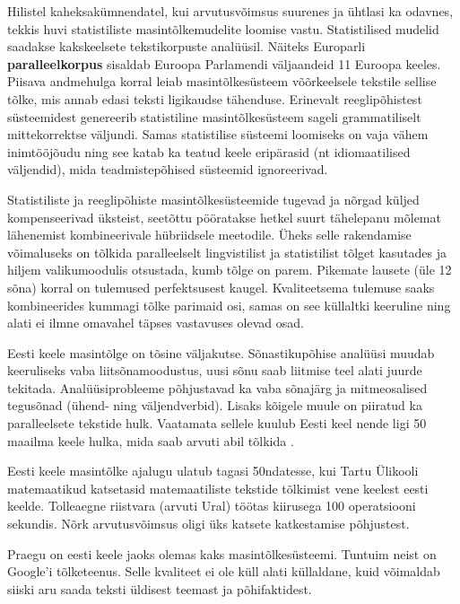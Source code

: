 \begin{multicols}{2}
Hilistel kaheksakümnendatel, kui arvutusvõimsus suurenes ja ühtlasi ka odavnes, tekkis huvi statistiliste masintõlkemudelite loomise vastu. 
Statistilised mudelid saadakse kakskeelsete tekstikorpuste analüüsil. 
Näiteks Europarli \textbf{paralleelkorpus} sisaldab Euroopa Parlamendi väljaandeid 11 Euroopa keeles. 
Piisava andmehulga korral leiab masintõlkesüsteem võõrkeelsele tekstile sellise tõlke, mis annab edasi teksti ligikaudse tähenduse. 
Erinevalt reeglipõhistest süsteemidest genereerib statistiline masintõlkesüsteem sageli grammatiliselt mittekorrektse väljundi. 
Samas statistilise süsteemi loomiseks on vaja vähem inimtööjõudu ning see katab ka teatud keele eripärasid (nt idiomaatilised väljendid), mida teadmistepõhised süsteemid ignoreerivad. 


Statistiliste ja reeglipõhiste masintõlkesüsteemide tugevad ja nõrgad küljed kompenseerivad üksteist, seetõttu pööratakse hetkel suurt tähelepanu mõlemat lähenemist kombineerivale hübriidsele meetodile. 
Üheks selle rakendamise võimaluseks on tõlkida paralleelselt lingvistilist ja statistilist tõlget kasutades ja hiljem valikumoodulis otsustada, kumb tõlge on parem. 
Pikemate lausete (üle 12 sõna) korral on tulemused perfektsusest kaugel. 
Kvaliteetsema tulemuse saaks kombineerides kummagi tõlke parimaid osi, samas on see küllaltki keeruline ning alati ei ilmne omavahel täpses vastavuses olevad osad. 



Eesti keele masintõlge on tõsine väljakutse. 
Sõnastikupõhise analüüsi muudab keeruliseks vaba liitsõnamoodustus, uusi sõnu saab liitmise teel alati juurde tekitada. 
Analüüsiprobleeme põhjustavad ka vaba sõnajärg ja mitmeosalised tegusõnad (ühend- ning väljendverbid). 
Lisaks kõigele muule on piiratud ka paralleelsete tekstide hulk. 
Vaatamata sellele kuulub Eesti keel nende ligi 50 maailma keele hulka, mida saab arvuti abil tõlkida \cite{Koit}.

Eesti keele masintõlke ajalugu ulatub tagasi 50ndatesse, kui Tartu Ülikooli matemaatikud katsetasid matemaatiliste tekstide tõlkimist vene keelest eesti keelde. 
Tolleaegne riistvara (arvuti Ural) töötas kiirusega 100 operatsiooni sekundis. Nõrk arvutusvõimsus oligi üks katsete katkestamise põhjustest. 

Praegu on eesti keele jaoks olemas kaks masintõlkesüsteemi. 
Tuntuim neist on Google’i tõlketeenus. 
Selle kvaliteet ei ole küll alati küllaldane, kuid võimaldab \mbox{siiski} aru saada teksti üldisest teemast ja põhifaktidest.


\end{multicols}
